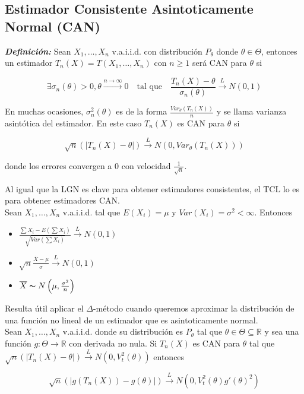 \subsection{Estimador Consistente Asintoticamente Normal (CAN)}

\textbf{\textit{Definición: }} Sean $X_1,\dots,X_n$ v.a.i.i.d. con distribución $P_\theta$ donde $\theta \in \Theta$, entonces un estimador $T_n(X)=T(X_1,\dots,X_n)$ con $n\geq 1$ será CAN para $\theta$ si

\[
    \exists \sigma_n(\theta) > 0, \theta \xrightarrow{n\to\infty}0 \quad \text{tal que}\quad \frac{T_n(X)-\theta}{\sigma_n(\theta)}\overset{L}{\to}N(0,1)
\]

En muchas ocasiones, $\sigma^2_n(\theta)$ es de la forma $\frac{Var_\theta(T_n(X))}{n}$ y se llama varianza asintótica del estimador. En este caso $T_n(X)$ es CAN para $\theta$ si

\[
    \sqrt{n}(|T_n(X)-\theta|) \overset{L}{\to} N(0, Var_\theta(T_n(X)))
\]

donde los errores convergen a 0 con velocidad $\frac{1}{\sqrt{n}}$.

Al igual que la LGN es clave para obtener estimadores consistentes, el TCL lo es para obtener estimadores CAN. \\
Sean $X_1,\dots,X_n$ v.a.i.i.d. tal que $E(X_i)=\mu$ y $Var(X_i)=\sigma^2 < \infty$. Entonces

\begin{itemize}
    \item $\frac{\sum{X_i} - E(\sum{X_i})}{\sqrt{Var(\sum{X_i})}} \overset{L}{\to} N(0,1)$
    \item $\sqrt{n}\frac{\overline{X}-\mu}{\sigma}\overset{L}{\to}N(0,1)$
    \item $\overline{X}\thicksim N\left(\mu,\frac{\sigma^2}{n}\right)$
\end{itemize}

Resulta útil aplicar el $\Delta$-método cuando queremos aproximar la distribución de una función no lineal de un estimador que es asintoticamente normal.\\
Sean $X_1,\dots,X_n$ v.a.i.i.d. donde su distribución es $P_\theta$ tal que $\theta \in \Theta \subseteq \mathbb{R}$ y sea una función $g:\Theta \to \mathbb{R}$ con derivada no nula. Si $T_n(X)$ es CAN para $\theta$ tal que $\sqrt{n}(|T_n(X)-\theta|)\overset{L}{\to}N(0,V^2_t(\theta))$ entonces

\[
    \sqrt{n}(|g(T_n(X))-g(\theta)|)\overset{L}{\to}N(0,V^2_t(\theta)g'(\theta)^2)
\]

